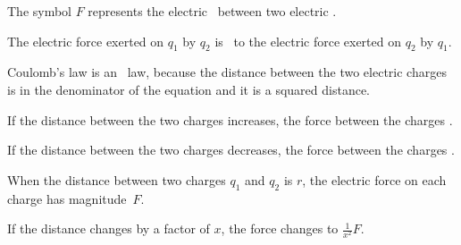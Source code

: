 \documentclass[answers]{exam}
\begin{document}
\begin{questions}
\question
The symbol $F$ represents the electric \fillin[force][3cm]\ between two electric \fillin[charges][3cm].

\question
The electric force exerted on $q_1$ by $q_2$ is \fillin[equal][3cm]\ to the electric force exerted on $q_2$ by $q_1$.

\question
Coulomb's law is an \ law, because the distance between the two electric charges is in the denominator of the equation and it is a squared distance.

\question 
If the distance between the two charges increases, the force between the charges \fillin[decreases][3cm].

\question
If the distance between the two charges decreases, the force between the charges \fillin[increases][3cm].

\question
When the distance between two charges $q_1$ and $q_2$ is $r$, the electric force on each charge has magnitude~$F$.

\begin{center}
\end{center}

If the distance changes by a factor of $x$, the force changes to $\displaystyle \frac{1}{x^2} F$.




\newcommand{\checkedbox}{%
  \ooalign{%
    $\square$\cr
    \hidewidth${\large \hspace{4pt}\checkmark}$\hidewidth\cr
  }%
}


\end{questions}
\end{document}
